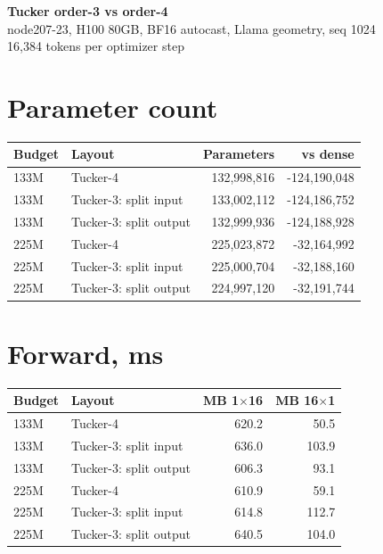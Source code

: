 \documentclass[10pt]{article}
\begin{document}
\begin{center}
{\LARGE\bfseries Tucker order-3 vs order-4}\\[3pt]
{\large node207-23, H100 80GB, BF16 autocast, Llama geometry, seq 1024}\\[2pt]
{16,384 tokens per optimizer step}
\end{center}
\section{Parameter count}
\begin{center}
\small
\begin{tabular}{llrr}
\toprule
\textbf{Budget} & \textbf{Layout} & \textbf{Parameters} & \textbf{vs dense} \\
\midrule
133M & Tucker-4 & 132,998,816 & -124,190,048 \\
133M & Tucker-3: split input & 133,002,112 & -124,186,752 \\
133M & Tucker-3: split output & 132,999,936 & -124,188,928 \\
225M & Tucker-4 & 225,023,872 & -32,164,992 \\
225M & Tucker-3: split input & 225,000,704 & -32,188,160 \\
225M & Tucker-3: split output & 224,997,120 & -32,191,744 \\
\bottomrule
\end{tabular}
\end{center}
\section{Forward, ms}
\begin{center}
\small
\begin{tabular}{llrr}
\toprule
\textbf{Budget} & \textbf{Layout} & \textbf{MB 1$\times$16} & \textbf{MB 16$\times$1} \\
\midrule
133M & Tucker-4 & 620.2 & 50.5 \\
133M & Tucker-3: split input & 636.0 & 103.9 \\
133M & Tucker-3: split output & 606.3 & 93.1 \\
225M & Tucker-4 & 610.9 & 59.1 \\
225M & Tucker-3: split input & 614.8 & 112.7 \\
225M & Tucker-3: split output & 640.5 & 104.0 \\
\bottomrule
\end{tabular}
\end{center}
\end{document}
